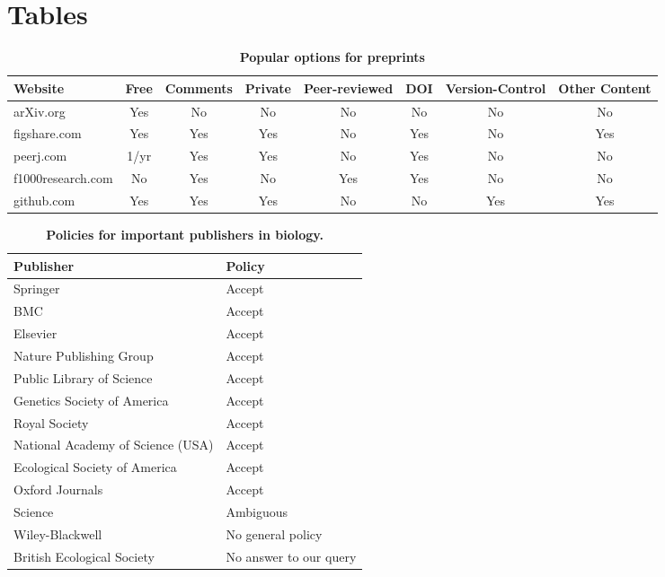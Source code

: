 \documentclass[10pt]{article}
\begin{document}
\newpage
\section*{Tables}

\begin{table}[!ht]
  \caption{\bf{Popular options for preprints}}
  \begin{tabular}{|l|ccccccc|}
  \hline
  Website               & Free & Comments & Private & Peer-reviewed & DOI & Version-Control & Other Content\\
  \hline
  arXiv.org             & Yes & No & No & No & No & No & No\\
  figshare.com          & Yes & Yes & Yes & No & Yes & No & Yes\\
  peerj.com             & 1/yr & Yes & Yes & No & Yes & No & No\\
  f1000research.com     & No & Yes & No & Yes & Yes & No & No\\
  github.com            & Yes & Yes & Yes & No & No & Yes & Yes\\
  \hline
  \end{tabular}
  \label{table:box1}
\end{table}

\begin{table}[!ht]
  \caption{\bf{Policies for important publishers in biology.}}
  \begin{tabular}{|ll|}
  \hline
  Publisher                             & Policy \\
  \hline
  Springer                              & Accept \\
  BMC                                   & Accept \\
  Elsevier                              & Accept \\
  Nature Publishing Group               & Accept \\
  Public Library of Science             & Accept \\
  Genetics Society of America           & Accept \\
  Royal Society                         & Accept \\
  National Academy of Science (USA)     & Accept \\
  Ecological Society of America         & Accept \\
  Oxford Journals                       & Accept \\
  Science                               & Ambiguous \\
  Wiley-Blackwell                       & No general policy \\
  British Ecological Society            & No answer to our query \\
  \hline
  \end{tabular}
  \label{table:policies}
\end{table}
\end{document}
